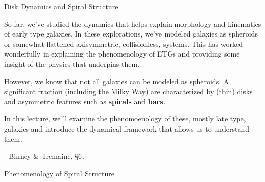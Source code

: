 \documentclass[letterpaper,landscape]{slides}
\begin{document}
\begin{slide}
\vskip 4.5in
\begin{center}
{\large \color{red} 
                  Disk Dynamics and Spiral Structure   }
\end{center}

So far, we've studied the dynamics that helps explain morphology and
kinematics of early type galaxies.  In these explorations, we've modeled
galaxies as spheroids or somewhat flattened axisymmetric, collisionless,
systems.  This has worked wonderfully in explaining the phenomenology
of ETGs and providing some insight of the physics that underpins them.

However, we know that not all galaxies can be modeled as spheroids. A
significant fraction (including the Milky Way) are characterized by 
(thin) disks and asymmetric features such as {\bf spirals} and {\bf bars}.

In this lecture, we'll examine the phenomoenology of these, mostly late
type, galaxies and introduce the dynamical framework that allows us to
understand them.

\vskip 0in

\begin{flushright}
{ \tiny - Binney \& Tremaine, \S6. } \\
\end{flushright}

\end{slide}

\begin{slide}
\begin{center}
\vskip 3in
{\large \color{red} Phenomenology of Spiral Structure  }
\end{center}

\end{slide}
\end{document}
